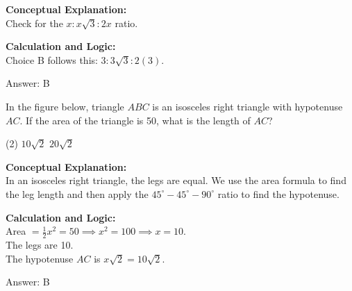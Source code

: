 \documentclass[11pt,paper=a4,answers]{exam}
\begin{document}
\begin{questions}
\begin{solution}
\textbf{Conceptual Explanation:} \\
Check for the $x : x\sqrt{3} : 2x$ ratio.

\vspace{10pt}
\textbf{Calculation and Logic:} \\
Choice B follows this: $3 : 3\sqrt{3} : 2(3)$.

\vspace{15pt}
Answer: \colorbox{yellow!100}{B}
\end{solution}



\question
In the figure below, triangle $ABC$ is an isosceles right triangle with hypotenuse $AC$. If the area of the triangle is 50, what is the length of $AC$?
\begin{center}
\end{center}
\begin{tasks}(2)
    \task $10\sqrt{2}$
    \task $20\sqrt{2}$
\end{tasks}

\begin{solution}
\textbf{Conceptual Explanation:} \\
In an isosceles right triangle, the legs are equal. We use the area formula to find the leg length and then apply the $45^\circ-45^\circ-90^\circ$ ratio to find the hypotenuse.

\vspace{10pt}
\textbf{Calculation and Logic:} \\
Area $= \frac{1}{2}x^2 = 50 \implies x^2 = 100 \implies x = 10$. \\
The legs are 10. \\
The hypotenuse $AC$ is $x\sqrt{2} = 10\sqrt{2}$.

\vspace{15pt}
Answer: \colorbox{yellow!100}{B}
\end{solution}


\end{questions}
\end{document}
